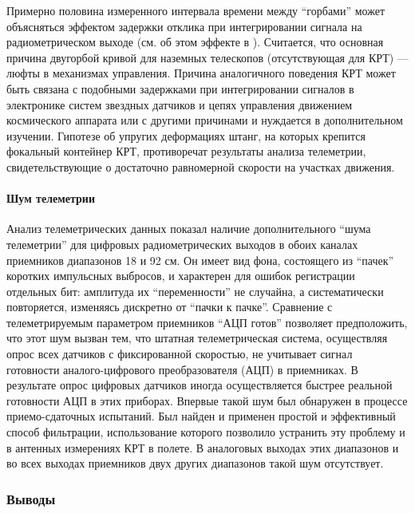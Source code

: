 Примерно половина измеренного интервала времени между ``горбами''
может объясняться эффектом задержки отклика при интегрировании
сигнала на радиометрическом выходе (см. об этом эффекте в \cite{}).
Считается, что основная причина двугорбой кривой для наземных телескопов
(отсутствующая для КРТ) --- люфты в механизмах управления.
Причина аналогичного поведения КРТ может быть связана с подобными задержками
при интегрировании сигналов в электронике систем звездных датчиков и
цепях управления
движением космического аппарата или с другими причинами и нуждается в
дополнительном изучении.
Гипотезе об упругих деформациях штанг, на которых крепится фокальный контейнер
КРТ, противоречат результаты анализа телеметрии, свидетельствующие
о достаточно равномерной скорости на участках движения.

\paragraph{Шум телеметрии}

Анализ телеметрических данных показал наличие дополнительного
``шума телеметрии'' для цифровых радиометрических выходов в обоих каналах
приемников диапазонов 18 и 92 см.
Он имеет вид фона, состоящего из ``пачек'' коротких импульсных
выбросов, и характерен для ошибок регистрации отдельных бит: амплитуда их
``переменности'' не случайна, а систематически повторяется, изменяясь дискретно
от ``пачки к пачке''. Сравнение с телеметрируемым параметром приемников ``АЦП готов''
позволяет предположить, что этот шум вызван тем, что штатная телеметрическая система,
осуществляя опрос всех датчиков с фиксированной скоростью, не учитывает сигнал
готовности аналого-цифрового преобразователя (АЦП) в приемниках.
В результате опрос цифровых датчиков иногда осуществляется быстрее
реальной готовности АЦП в этих приборах. Впервые такой шум был обнаружен в
процессе приемо-сдаточных испытаний. Был найден и применен простой и эффективный
способ фильтрации, использование которого позволило устранить эту проблему
и в антенных измерениях КРТ в полете. В аналоговых выходах этих диапазонов
и во всех выходах приемников двух других диапазонов такой шум отсутствует.


\subsubsection{Выводы}

